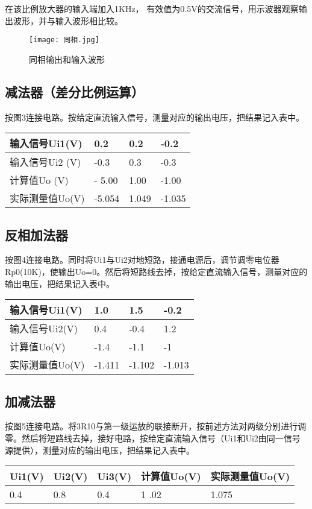 \documentclass[dvipsnames, svgnames,a4paper,11pt]{article}
\begin{document}
	在该比例放大器的输入端加入1KHz， 有效值为0.5V的交流信号，用示波器观察输出波形，并与输入波形相比较。
	\begin{figure}[{H}]
		\centering
		\texttt{[image: 同相.jpg]}
		\caption{同相输出和输入波形}
		\label{}
	\end{figure}
	\subsection{减法器（差分比例运算）}
	按图3连接电路。按给定直流输入信号，测量对应的输出电压，把结果记入表中。
	\begin{table}[H]
		\centering
		\begin{tabular}{|l|l|l|l|}
		\hline
			输入信号Ui1(V) & 0.2 & 0.2 & -0.2  \\ \hline
			  输入信号Ui2 (V) & -0.3 & 0.3 & -0.3  \\ \hline
			计算值Uo (V) &- 5.00& 1.00 & -1.00  \\ \hline
			实际测量值Uo(V) & -5.054 & 1.049 & -1.035  \\ \hline
		\end{tabular}
	\end{table}
	\subsection{反相加法器}
	按图4连接电路。同时将Ui1与Ui2对地短路，接通电源后，调节调零电位器Rp0(10K)，使输出Uo=0。然后将短路线去掉，按给定直流输入信号，测量对应的输出电压，把结果记入表中。
	\begin{table}[H]
		\centering
		\begin{tabular}{|l|l|l|l|}
		\hline
			输入信号Ui1(V) & 1.0 & 1.5 & -0.2  \\ \hline
			输入信号Ui2(V) & 0.4 & -0.4 & 1.2  \\ \hline
			计算值Uo(V) &-1.4 & -1.1 &  -1 \\ \hline
			实际测量值Uo(V) &-1.411 & -1.102 &   -1.013\\ \hline
		\end{tabular}
	\end{table}
	\subsection{加减法器}
	按图5连接电路。将3R10与第一级运放的联接断开，按前述方法对两级分别进行调零。然后将短路线去掉，接好电路，按给定直流输入信号（Ui1和Ui2由同一信号源提供），测量对应的输出电压，把结果记入表中。
	\begin{table}[!ht]
		\centering
		\begin{tabular}{|l|l|l|l|l|}
		\hline
			Ui1(V) & Ui2(V) & Ui3(V) & 计算值Uo(V) & 实际测量值Uo(V)  \\ \hline
			0.4 & 0.8 & 0.4 &1
			.02 & 1.075 \\ \hline
		\end{tabular}
	\end{table}
	
\end{document}
